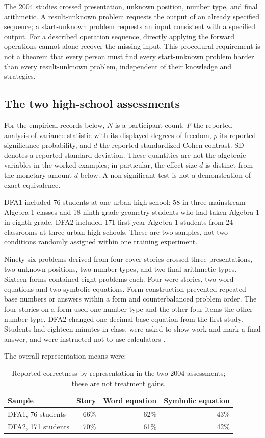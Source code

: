 The 2004 studies crossed presentation, unknown position, number type,
and final arithmetic. A result-unknown problem requests the output
of an already specified sequence; a start-unknown problem requests an
input consistent with a specified output. For a described operation
sequence, directly applying the forward operations cannot alone recover
the missing input. This procedural requirement is not a theorem that
every person must find every start-unknown problem harder than every
result-unknown problem, independent of their knowledge and strategies.

\subsection{The two high-school assessments}

For the empirical records below, \(N\) is a participant count, \(F\)
the reported analysis-of-variance statistic with its displayed degrees
of freedom, \(p\) its reported significance probability, and \(d\)
the reported standardized Cohen contrast. SD denotes a reported
standard deviation. These quantities are not the algebraic variables
in the worked examples; in particular, the effect-size \(d\) is
distinct from the monetary amount \(d\) below. A non-significant
test is not a demonstration of exact equivalence.

DFA1 included 76 students at one urban high school: 58 in three
mainstream Algebra 1 classes and 18 ninth-grade geometry students who
had taken Algebra 1 in eighth grade. DFA2 included 171 first-year
Algebra 1 students from 24 classrooms at three urban high schools.
These are two samples, not two conditions randomly assigned within
one training experiment.

Ninety-six problems derived from four cover stories crossed three
presentations, two unknown positions, two number types, and two final
arithmetic types. Sixteen forms contained eight problems each. Four
were stories, two word equations and two symbolic equations. Form
construction prevented repeated base numbers or answers within a form
and counterbalanced problem order. The four stories on a form used
one number type and the other four items the other number type.
DFA2 changed one decimal base equation from the first study. Students
had eighteen minutes in class, were asked to show work and mark a
final answer, and were instructed not to use calculators
\cite[pp.~139--142]{KoedingerNathan2004StoryCTA}.

The overall representation means were:
\begin{table}[htbp]
\centering
\begin{tabular}{lrrr}
\hline
Sample &Story&Word equation&Symbolic equation\\ \hline
DFA1, 76 students&66\%&62\%&43\%\\
DFA2, 171 students&70\%&61\%&42\%\\ \hline
\end{tabular}
\caption{Reported correctness by representation in the two 2004
assessments; these are not treatment gains.}
\label{tab:p19-cta-dfa}
\end{table}

